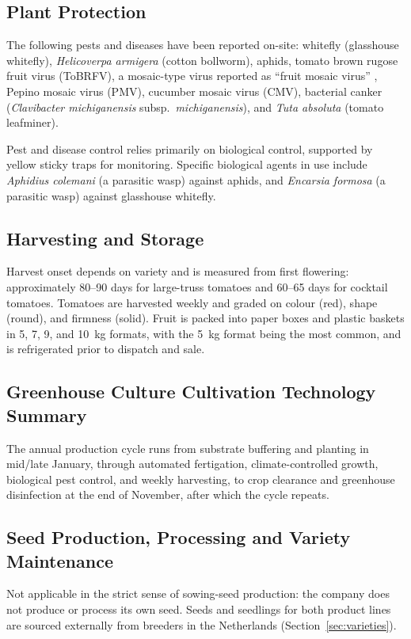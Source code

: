 \subsection{Plant Protection}
The following pests and diseases have been reported on-site: whitefly (glasshouse whitefly), \emph{Helicoverpa armigera} (cotton bollworm), aphids, tomato brown rugose fruit virus (ToBRFV), a mosaic-type virus reported as ``fruit mosaic virus'' , Pepino mosaic virus (PMV), cucumber mosaic virus (CMV), bacterial canker (\emph{Clavibacter michiganensis} subsp.\ \emph{michiganensis}), and \emph{Tuta absoluta} (tomato leafminer).

Pest and disease control relies primarily on biological control, supported by yellow sticky traps for monitoring. Specific biological agents in use include \emph{Aphidius colemani} (a parasitic wasp) against aphids, and \emph{Encarsia formosa} (a parasitic wasp) against glasshouse whitefly.

\subsection{Harvesting and Storage}
Harvest onset depends on variety and is measured from first flowering: approximately 80--90 days for large-truss tomatoes and 60--65 days for cocktail tomatoes. Tomatoes are harvested weekly and graded on colour (red), shape (round), and firmness (solid). Fruit is packed into paper boxes and plastic baskets in 5, 7, 9, and 10~kg formats, with the 5~kg format being the most common, and is refrigerated prior to dispatch and sale.

\subsection{Greenhouse Culture Cultivation Technology Summary}
The annual production cycle runs from substrate buffering and planting in mid/late January, through automated fertigation, climate-controlled growth, biological pest control, and weekly harvesting, to crop clearance and greenhouse disinfection at the end of November, after which the cycle repeats.

\subsection{Seed Production, Processing and Variety Maintenance}
Not applicable in the strict sense of sowing-seed production: the company does not produce or process its own seed. Seeds and seedlings for both product lines are sourced externally from breeders in the Netherlands (Section~\ref{sec:varieties}).

